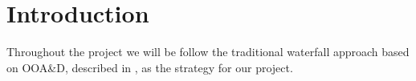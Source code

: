 \chapter{Introduction}

Throughout the project we will be follow the traditional waterfall  approach based on OOA\&D, described in \cite{mathiassen2001objektorienteret}, as the strategy for our project.

